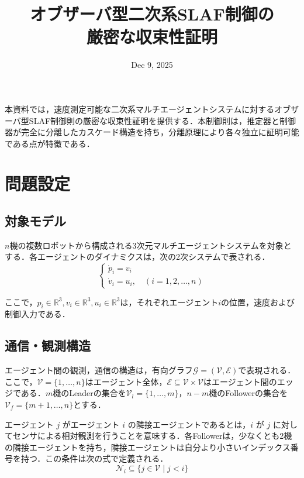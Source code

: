 \documentclass[a4paper]{jarticle}
\title{オブザーバ型二次系SLAF制御の\\厳密な収束性証明}
\author{滑川研究室\and}
\date{Dec 9, 2025}
\theoremstyle{definition}
\theoremstyle{remark}
\numberwithin{equation}{section}
\begin{document}
	
	\maketitle
	
	本資料では，速度測定可能な二次系マルチエージェントシステムに対するオブザーバ型SLAF制御則の厳密な収束性証明を提供する．本制御則は，推定器と制御器が完全に分離したカスケード構造を持ち，分離原理により各々独立に証明可能である点が特徴である．
	
	\section{問題設定}
	\subsection{対象モデル}
	
	$n$機の複数ロボットから構成される3次元マルチエージェントシステムを対象とする．各エージェントのダイナミクスは，次の2次システムで表される．
	\begin{equation}
		\begin{cases}
			\dot{p}_i = v_i \\
			\dot{v}_i = u_i , \quad (i = 1,2, \dots, n)
		\end{cases}
		\label{eq:dynamics}
	\end{equation}
	
	ここで，${p}_{i} \in \mathbb{R}^{3}, {v}_{i} \in \mathbb{R}^{3}, {u}_{i} \in \mathbb{R}^{3}$は，それぞれエージェント$i$の位置，速度および制御入力である．
	
	\subsection{通信・観測構造}
	
	エージェント間の観測，通信の構造は，有向グラフ$\mathcal{G} = (\mathcal{V}, \mathcal{E})$で表現される．ここで，$\mathcal{V} = \{1, \dots, n\}$はエージェント全体，$\mathcal{E} \subseteq \mathcal{V} \times \mathcal{V}$はエージェント間のエッジである．$m$機のLeaderの集合を$\mathcal{V}_l = \{1, \dots, m\}$，$n-m$機のFollowerの集合を$\mathcal{V}_f = \{m+1, \dots, n\}$とする．
	
	エージェント $j$ がエージェント $i$ の隣接エージェントであるとは，$i$ が $j$ に対してセンサによる相対観測を行うことを意味する．各Followerは，少なくとも2機の隣接エージェントを持ち，隣接エージェントは自分より小さいインデックス番号を持つ．この条件は次の式で定義される．	
	\begin{equation}
		\mathcal{N}_i \subseteq \{j \in \mathcal{V} \mid j < i \}
		\label{eq:neighbor}
	\end{equation}
	
\end{document}
